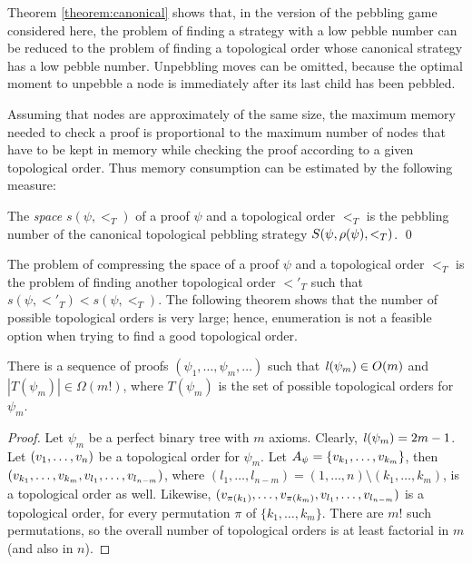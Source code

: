 \documentclass{llncs}
\newcommand{\Axioms}[1]{A_{#1}}
\begin{document}
\noindent
Theorem \ref{theorem:canonical} shows that, in the version of the pebbling game considered here, the problem of finding a strategy with a low pebble number can be reduced to the problem of finding a topological order whose canonical strategy has a low pebble number. Unpebbling moves can be omitted, because the optimal moment to unpebble a node is immediately after its last child has been pebbled.

Assuming that nodes are approximately of the same size, the maximum memory needed to check a proof is proportional to the maximum number of nodes that have to be kept in memory while checking the proof according to a given topological order. Thus memory consumption can be estimated by the following measure:

\newcommand{\pspace}[2]{s(#1,#2)}
\begin{definition}[Space]
\label{def:space measure}
The \emph{space} $\pspace{\psi}{<_T}$ 
of a proof $\psi$ and a topological order $<_T$ is the pebbling number of the canonical topological pebbling strategy $S(\psi,\rho(\psi),<_T)$.
\qed
\end{definition}

\noindent
The problem of compressing the space of a proof $\psi$ and a topological order $<_T$ is the problem of finding another topological order $<'_T$ such that $\pspace{\psi}{<'_T} < \pspace{\psi}{<_T}$. The following theorem shows that the number of possible topological orders is very large; hence, enumeration is not a feasible option when trying to find a good topological order.

\begin{theorem}
\label{theorem:enumeration}
There is a sequence of proofs $(\psi_1,\ldots,\psi_m,\ldots)$ such that $\mathit{l}(\psi_m) \in O(m)$ and $|T(\psi_m)| \in \Omega(m!)$, where $T(\psi_m)$ is the set of possible topological orders for $\psi_m$.
\end{theorem}
\begin{proof}
Let $\psi_m$ be a perfect binary tree with $m$ axioms. Clearly, $\mathit{l}(\psi_m) = 2m-1$.
Let $(v_1,\ldots,v_n)$ be a topological order for $\psi_m$. 
Let $\Axioms{\psi} = \{\n_{k_1},\ldots,\n_{k_m}\}$, then $(v_{k_1},\ldots,v_{k_m},v_{l_1},\ldots,v_{l_{n-m}})$, where $(l_1,\ldots,l_{n-m}) = (1,\ldots,n) \setminus (k_1,\ldots,k_m)$, is a topological order as well. 
Likewise, $(v_{\pi({k_1})},\ldots,v_{\pi({k_m})},v_{l_1},\ldots,v_{l_{n-m}})$ is a topological order, for every permutation $\pi$ of $\{k_1,\ldots,k_m\}$. There are $m!$ such permutations, so the overall number of topological orders is at least factorial in $m$ (and also in $n$).
\end{proof}
\end{document}
